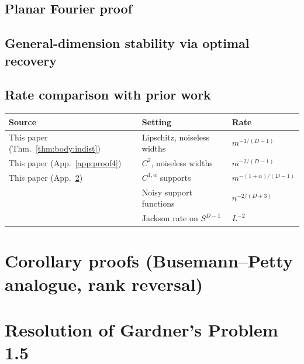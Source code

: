 \documentclass{article}
\begin{document}
\subsection*{Planar Fourier proof}


\subsection*{General-dimension stability via optimal recovery}


\subsection*{Rate comparison with prior work}

\begin{center}\small
\begin{tabular}{lll}
\toprule
Source & Setting & Rate \\
\midrule
This paper (Thm.~\ref{thm:body:indist}) & Lipschitz, noiseless widths
                                          & $m^{-1/(D-1)}$ \\
This paper (App.~\ref{app:proof4})       & $C^2$, noiseless widths
                                          & $m^{-2/(D-1)}$ \\
This paper (App.~\ref{app:gardner})      & $C^{1,\alpha}$ supports
                                          & $m^{-(1+\alpha)/(D-1)}$ \\
\citet{guntuboyina2011minimax}           & Noisy support functions
                                          & $n^{-2/(D+3)}$ \\
\citet{ragozin1970polynomial}            & Jackson rate on $S^{D-1}$
                                          & $L^{-2}$ \\
\bottomrule
\end{tabular}
\end{center}

\section{Corollary proofs (Busemann--Petty analogue, rank reversal)}
\label{app:cor}


\section{Resolution of Gardner's Problem 1.5}
\label{app:gardner}
\end{document}
